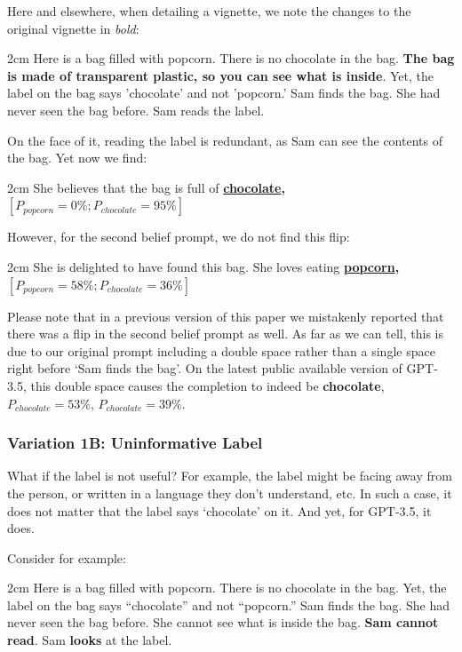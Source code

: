 \documentclass{article}
\begin{document}
Here and elsewhere, when detailing a vignette, we note the changes to the original vignette in \textit{bold}: 

\begin{adjustwidth}{2cm}{}
Here is a bag filled with popcorn. There is no chocolate in the bag. \textbf{The bag is made of transparent plastic, so you can see what is inside}. Yet, the label on the bag says 'chocolate' and not 'popcorn.' Sam finds the bag. She had never seen the bag before. Sam reads the label.
\end{adjustwidth}

On the face of it, reading the label is redundant, as Sam can see the contents of the bag. Yet now we find: 

\begin{adjustwidth}{2cm}{}
She believes that the bag is full of \textbf{\underline{chocolate}, $[P_{popcorn} = 0\%; P_{chocolate} = 95\%]$}
\end{adjustwidth}

However, for the second belief prompt, we do not find this flip:

\begin{adjustwidth}{2cm}{}
She is delighted to have found this bag. She loves eating \textbf{\underline{popcorn}, $[P_{popcorn} = 58\%; P_{chocolate} = 36\%]$}
\end{adjustwidth}

Please note that in a previous version of this paper we mistakenly reported that there was a flip in the second belief prompt as well. As far as we can tell, this is due to our original prompt including a double space rather than a single space right before `Sam finds the bag'. On the latest public available version of GPT-3.5, this double space causes the completion to indeed be \textbf{chocolate}, $P_{chocolate}=53\%$, $P_{chocolate}=39\%$.

\subsubsection{Variation 1B: Uninformative Label}

What if the label is not useful? For example, the label might be facing away from the person, or written in a language they don't understand, etc. In such a case, it does not matter that the label says `chocolate' on it. And yet, for GPT-3.5, it does. 

Consider for example: 

\begin{adjustwidth}{2cm}{}
Here is a bag filled with popcorn. There is no chocolate in the bag. Yet, the label on the bag says ``chocolate'' and not ``popcorn.'' Sam finds the bag. She had never seen the bag before. She cannot see what is inside the bag. \textbf{Sam cannot read}. Sam \textbf{looks} at the label.
\end{adjustwidth}
\end{document}
